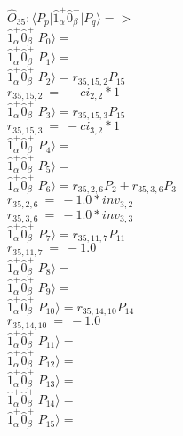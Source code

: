\documentclass[14pt]{article}
\begin{document}
    $\hat{O}_{35}:  \langle{P_p}\vert \hat{1}_{\alpha}^{+}\hat{0}_{\beta}^{+} \vert{P_q}\rangle => $ \\ 
    $ \hat{1}_{\alpha}^{+}\hat{0}_{\beta}^{+} \vert{P_{0}}\rangle =  $ \\ 
    $ \hat{1}_{\alpha}^{+}\hat{0}_{\beta}^{+} \vert{P_{1}}\rangle =  $ \\ 
    $ \hat{1}_{\alpha}^{+}\hat{0}_{\beta}^{+} \vert{P_{2}}\rangle = {r}_{35,15,2}P_{15} $ \\ 
    ${r}_{35,15,2}\ =\ -{ci}_{2,2}*1 $ \\ 
    $ \hat{1}_{\alpha}^{+}\hat{0}_{\beta}^{+} \vert{P_{3}}\rangle = {r}_{35,15,3}P_{15} $ \\ 
    ${r}_{35,15,3}\ =\ -{ci}_{3,2}*1 $ \\ 
    $ \hat{1}_{\alpha}^{+}\hat{0}_{\beta}^{+} \vert{P_{4}}\rangle =  $ \\ 
    $ \hat{1}_{\alpha}^{+}\hat{0}_{\beta}^{+} \vert{P_{5}}\rangle =  $ \\ 
    $ \hat{1}_{\alpha}^{+}\hat{0}_{\beta}^{+} \vert{P_{6}}\rangle = {r}_{35,2,6}P_{2}+{r}_{35,3,6}P_{3} $ \\ 
    ${r}_{35,2,6}\ =\ -1.0*{inv}_{3,2} $ \\ 
    ${r}_{35,3,6}\ =\ -1.0*{inv}_{3,3} $ \\ 
    $ \hat{1}_{\alpha}^{+}\hat{0}_{\beta}^{+} \vert{P_{7}}\rangle = {r}_{35,11,7}P_{11} $ \\ 
    ${r}_{35,11,7}\ =\ -1.0 $ \\ 
    $ \hat{1}_{\alpha}^{+}\hat{0}_{\beta}^{+} \vert{P_{8}}\rangle =  $ \\ 
    $ \hat{1}_{\alpha}^{+}\hat{0}_{\beta}^{+} \vert{P_{9}}\rangle =  $ \\ 
    $ \hat{1}_{\alpha}^{+}\hat{0}_{\beta}^{+} \vert{P_{10}}\rangle = {r}_{35,14,10}P_{14} $ \\ 
    ${r}_{35,14,10}\ =\ -1.0 $ \\ 
    $ \hat{1}_{\alpha}^{+}\hat{0}_{\beta}^{+} \vert{P_{11}}\rangle =  $ \\ 
    $ \hat{1}_{\alpha}^{+}\hat{0}_{\beta}^{+} \vert{P_{12}}\rangle =  $ \\ 
    $ \hat{1}_{\alpha}^{+}\hat{0}_{\beta}^{+} \vert{P_{13}}\rangle =  $ \\ 
    $ \hat{1}_{\alpha}^{+}\hat{0}_{\beta}^{+} \vert{P_{14}}\rangle =  $ \\ 
    $ \hat{1}_{\alpha}^{+}\hat{0}_{\beta}^{+} \vert{P_{15}}\rangle =  $ \\ 
    
\end{document}
